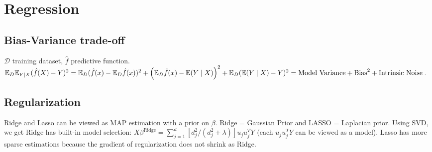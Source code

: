 \section{Regression}

\subsection*{Bias-Variance trade-off}
$\mathcal{D}$ training dataset, $\hat{f}$ predictive function.
$ \mathbb{E}_D \mathbb{E}_{Y\mid X} (\hat{f}(X)-Y)^2 = \mathbb{E}_D (\hat{f}(x)-\mathbb{E}_D \hat{f}(x))^2 + \left(\mathbb{E}_D \hat{f}(x)-\mathbb{E}(Y\mid X)\right)^2 + \mathbb{E}_D (\mathbb{E}(Y\mid X)-Y)^2 = \text{Model Variance} + \text{Bias}^2 + \text{Intrinsic Noise}$. 

\subsection*{Regularization}

Ridge and Lasso can be viewed as MAP estimation with a prior on $\beta$. Ridge = Gaussian Prior and LASSO = Laplacian prior. Using SVD, we get Ridge has built-in model selection:  $X\beta^{\text{Ridge}} = \sum_{j=1}^d [d_j^2 /(d_j^2+\lambda)] u_j u_j^T Y$ (each $u_j u_j^T Y$ can be viewed as a model). Lasso has more sparse estimations because the gradient of regularization does not shrink as Ridge.
